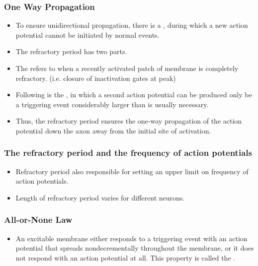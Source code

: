 \documentclass{article}
\numberwithin{equation}{section}
\begin{document}
\subsubsection{One Way Propagation}
\begin{itemize}
    \item To ensure unidirectional propagation, there is a , during which a new action potential cannot be initiated by normal events.
    \item The refractory period has two parts. 
    \item The  refers to when a recently activated patch of membrane is completely refractory. (i.e. closure of inactivation gates at peak)
    \item Following is the , in which a second action potential can be produced only be a triggering event considerably larger than is usually necessary.
    \item Thus, the refractory period ensures the one-way propagation of the action potential down the axon away from the initial site of activation.
\end{itemize}
\subsubsection{The refractory period and the frequency of action potentials}
\begin{itemize}
    \item Refractory period also responsible for setting an upper limit on frequency of action potentials.
    \item Length of refractory period varies for different neurons.
\end{itemize}
\subsubsection{All-or-None Law}
\begin{itemize}
    \item An excitable membrane either responds to a triggering event with an action potential that spreads nondecrementally throughout the membrane, or it does not respond with an action potential at all. This property is called the .
\end{itemize}
\end{document}
